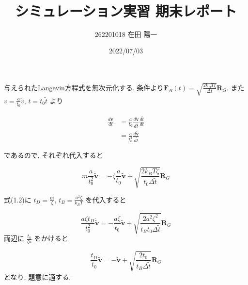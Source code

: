 \documentclass[a4paper,dvipdfmx]{jarticle}
\begin{document}
\title{シミュレーション実習 期末レポート}
\author{262201018 在田 陽一}
\date{2022/07/03}
\maketitle


\section{}

\subsection{}

\noindent
与えられたLangevin方程式を無次元化する.
条件より$\bm{F}_B(t)=\sqrt{\frac{2k_BT\zeta}{\Delta t}}\bm{R}_G$. 
また $v=\frac{a}{t_0}\tilde{v}$, $t=t_0\tilde{t}$ より

\begin{align*}
    \frac{d\bm{v}}{dt} &= \frac{a}{t_0}\frac{d\bm{\tilde{v}}}{d\tilde{t}} \frac{d\tilde{t}}{dt} \\ 
    &= \frac{a}{t_0^2} \frac{d\bm{\tilde{v}}}{d\tilde{t}}  \tag{1.1}
\end{align*}

\noindent
であるので, それぞれ代入すると

\begin{equation}
    m \frac{a}{t_0^2} \bm{\dot{\tilde{v}}} = -\zeta \frac{a}{t_0} \bm{\tilde{v}} 
    + \sqrt{\frac{2k_BT \zeta}{t_0 \Delta \tilde{t}}}\bm{R}_G \tag{1.2}
\end{equation}

\noindent
式(1.2)に $t_D=\frac{m}{\zeta}$, $t_B=\frac{a^2 \zeta}{k_BT}$ を代入すると

\begin{equation}
    \frac{a\zeta t_D}{t_0^2} \bm{\dot{\tilde{v}}} = -\frac{a\zeta}{t_0} \bm{\tilde{v}} 
    + \sqrt{\frac{2a^2\zeta ^2}{t_Bt_0 \Delta \tilde{t}}}\bm{R}_G \tag{1.3} 
\end{equation}
両辺に $\frac{t_0}{\zeta a}$ をかけると

\begin{equation}
    \frac{t_D}{t_0} \bm{\dot{\tilde{v}}} = -\bm{\tilde{v}} 
    + \sqrt{\frac{2t_0}{t_B\Delta \tilde{t}}}\bm{R}_G \tag{1.4} 
\end{equation}
となり, 題意に適する.


\subsection{}
\end{document}
